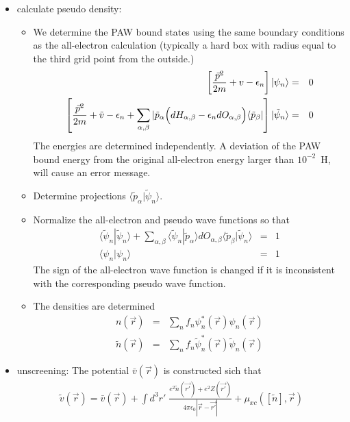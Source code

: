 \documentclass[11pt,a4paper]{report}
\begin{document}
\begin{itemize}
\item calculate pseudo density: 
\begin{itemize}
\item We determine the PAW bound states
  using the same boundary conditions as the all-electron calculation
  (typically a hard box with radius equal to the third grid point from
  the outside.)
\begin{eqnarray*}
\left[\frac{\vec{p}^2}{2m}+v-\epsilon_n
\right]|\psi_n\rangle&=&0
\\
\left[\frac{\vec{p}^2}{2m}+\tilde{v}-\epsilon_n
+\sum_{\alpha,\beta}|\tilde{p}_\alpha\Bigl(
dH_{\alpha,\beta}-\epsilon_n dO_{\alpha,\beta}\Bigr)
\langle\tilde{p}_\beta|\right]|\tilde\psi_n\rangle&=&0
\end{eqnarray*}
The energies are determined independently. A deviation of the PAW
bound energy from the original all-electron energy larger than
$10^{-2}$~H, will cause an error message.

\item Determine projections $\langle\tilde{p}_\alpha|\tilde\psi_n\rangle$.

\item Normalize the all-electron and pseudo wave functions so that
\begin{eqnarray*}
\langle\tilde{\psi}_n|\tilde{\psi}_n\rangle
+\sum_{\alpha,\beta}\langle\tilde{\psi}_n|\tilde{p}_\alpha\rangle dO_{\alpha,\beta}
\langle\tilde{p}_\beta|\tilde{\psi}_n\rangle &=&1
\\
\langle\psi_n|\psi_n\rangle&=&1
\end{eqnarray*}
The sign of the all-electron wave function is changed if it is
inconsistent with the corresponding pseudo wave function.

\item The densities are determined
\begin{eqnarray*}
n(\vec{r})&=&\sum_n f_n\psi^*_n(\vec{r})\psi_n(\vec{r})
\\
\tilde{n}(\vec{r})&=&\sum_n f_n\tilde{\psi}^*_n(\vec{r})\tilde{\psi}_n(\vec{r})
\end{eqnarray*}
\end{itemize}
\item unscreening: The potential $\bar{v}(\vec{r})$ is constructed sich that
\begin{eqnarray*}
\tilde{v}(\vec{r})=\bar{v}(\vec{r})+\int d^3r'\;
\frac{e^2\tilde{n}(\vec{r'})+e^2Z(\vec{r'})}{4\pi\epsilon_0|\vec{r}-\vec{r'}|}
+\mu_{xc}([\tilde{n}],\vec{r})
\end{eqnarray*}
\end{itemize}
\end{document}

